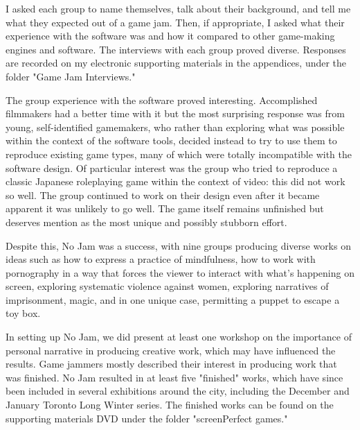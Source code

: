 I asked each group to name themselves, talk about their background, and tell me what they expected out of a game jam. Then, if appropriate, I asked what their experience with the software was and how it compared to other game-making engines and software. The interviews with each group proved diverse. Responses are recorded on my electronic supporting materials in the appendices, under the folder "Game Jam Interviews."

The group experience with the software proved interesting. Accomplished filmmakers had a better time with it but the most surprising response was from young, self-identified gamemakers, who rather than exploring what was possible within the context of the software tools, decided instead to try to use them to reproduce existing game types, many of which were totally incompatible with the software design. Of particular interest was the group who tried to reproduce a classic Japanese roleplaying game within the context of video: this did not work so well. The group continued to work on their design even after it became apparent it was unlikely to go well. The game itself remains unfinished but deserves mention as the most unique and possibly stubborn effort.

Despite this, No Jam was a success, with nine groups producing diverse works on ideas such as how to express a practice of mindfulness, how to work with pornography in a way that forces the viewer to interact with what's happening on screen, exploring systematic violence against women, exploring narratives of imprisonment, magic, and in one unique case, permitting a puppet to escape a toy box. 

In setting up No Jam, we did present at least one workshop on the importance of personal narrative in producing creative work, which may have influenced the results. Game jammers mostly described their interest in producing work that was finished. No Jam resulted in at least five "finished" works, which have since been included in several exhibitions around the city, including the December and January Toronto Long Winter series. The finished works can be found on the supporting materials DVD under the folder "screenPerfect games."